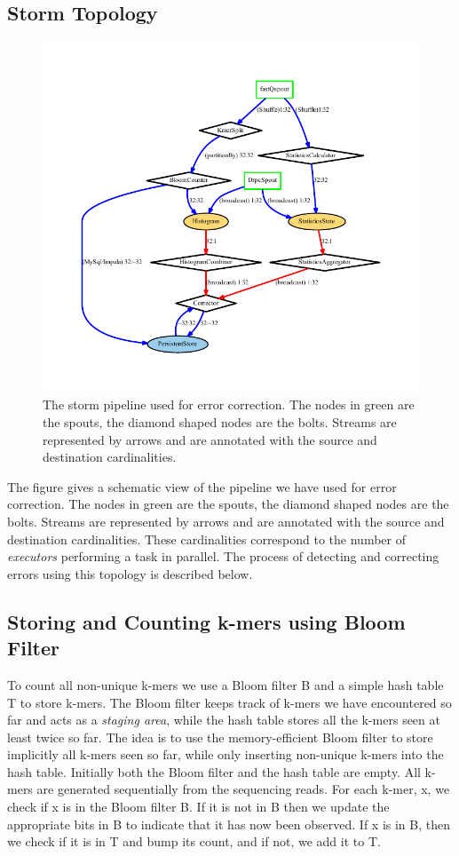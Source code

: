 \documentclass[11pt]{article}
\begin{document}
\subsection{Storm Topology}
\begin{figure}[ht!]
\centering
\includegraphics[width=120mm]{topology.pdf}
\caption{\tiny{The storm pipeline used for error correction. The nodes in green are the spouts, the diamond shaped nodes are the bolts. Streams are represented by arrows and are annotated with the source and destination cardinalities.}}
\label{overflow}
\end{figure}
The figure gives a schematic view of the pipeline we have used for error correction. The nodes in green are the spouts, the diamond shaped nodes are the bolts. Streams are represented by arrows and are annotated with the source and destination cardinalities. These cardinalities correspond to the number of \emph{executors} performing a task in parallel. The process of detecting and correcting errors using this topology is described below.

\subsection{Storing and Counting k-mers using Bloom Filter}
To count all non-unique k-mers we use a Bloom filter B and a simple hash table T to store k-mers. The Bloom filter keeps track of k-mers we have encountered so far and acts as a \emph{staging area}, while the hash table stores all the k-mers seen at least twice so far. The idea is to use the memory-efficient Bloom filter to store implicitly all k-mers seen so far, while only inserting non-unique k-mers into the hash table. Initially both the Bloom filter and the hash table are empty. All k-mers are generated sequentially from the sequencing reads. For each k-mer, x, we check if x is in the Bloom filter B. If it is not in B then we update the appropriate bits in B to indicate that it has now been observed. If x is in B, then we check if it is in T and bump its count, and if not, we add it to T.\\
\end{document}
